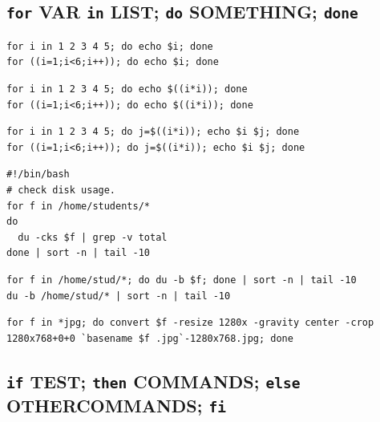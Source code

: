 \documentclass[12pt]{article}
\begin{document}
\subsection{\texttt{for} VAR \texttt{in} LIST; \texttt{do} SOMETHING; \texttt{done}}
\label{sec-3-1}
\begin{verbatim}
for i in 1 2 3 4 5; do echo $i; done
for ((i=1;i<6;i++)); do echo $i; done
\end{verbatim}
\begin{verbatim}
for i in 1 2 3 4 5; do echo $((i*i)); done
for ((i=1;i<6;i++)); do echo $((i*i)); done
\end{verbatim}
\begin{verbatim}
for i in 1 2 3 4 5; do j=$((i*i)); echo $i $j; done
for ((i=1;i<6;i++)); do j=$((i*i)); echo $i $j; done
\end{verbatim}
\begin{verbatim}
#!/bin/bash
# check disk usage.
for f in /home/students/*
do
  du -cks $f | grep -v total
done | sort -n | tail -10
\end{verbatim}
\begin{verbatim}
for f in /home/stud/*; do du -b $f; done | sort -n | tail -10
du -b /home/stud/* | sort -n | tail -10
\end{verbatim}
\begin{verbatim}
for f in *jpg; do convert $f -resize 1280x -gravity center -crop 1280x768+0+0 `basename $f .jpg`-1280x768.jpg; done
\end{verbatim}
\subsection{\texttt{if} TEST; \texttt{then} COMMANDS; \texttt{else} OTHERCOMMANDS; \texttt{fi}}
\label{sec-3-2}
\end{document}
